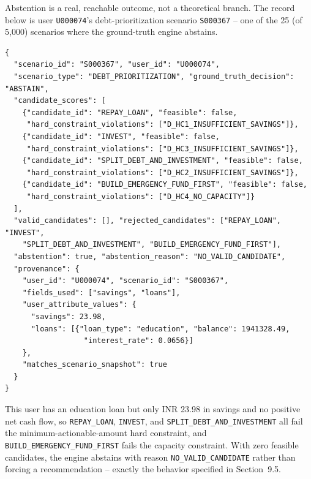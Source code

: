 \documentclass[12pt,a4paper]{article}
\begin{document}
Abstention is a real, reachable outcome, not a theoretical branch. The record below is user \texttt{U000074}'s debt-prioritization scenario \texttt{S000367} -- one of the 25 (of 5{,}000) scenarios where the ground-truth engine abstains.

{\scriptsize
\begin{verbatim}
{
  "scenario_id": "S000367", "user_id": "U000074",
  "scenario_type": "DEBT_PRIORITIZATION", "ground_truth_decision": "ABSTAIN",
  "candidate_scores": [
    {"candidate_id": "REPAY_LOAN", "feasible": false,
     "hard_constraint_violations": ["D_HC1_INSUFFICIENT_SAVINGS"]},
    {"candidate_id": "INVEST", "feasible": false,
     "hard_constraint_violations": ["D_HC3_INSUFFICIENT_SAVINGS"]},
    {"candidate_id": "SPLIT_DEBT_AND_INVESTMENT", "feasible": false,
     "hard_constraint_violations": ["D_HC2_INSUFFICIENT_SAVINGS"]},
    {"candidate_id": "BUILD_EMERGENCY_FUND_FIRST", "feasible": false,
     "hard_constraint_violations": ["D_HC4_NO_CAPACITY"]}
  ],
  "valid_candidates": [], "rejected_candidates": ["REPAY_LOAN", "INVEST",
    "SPLIT_DEBT_AND_INVESTMENT", "BUILD_EMERGENCY_FUND_FIRST"],
  "abstention": true, "abstention_reason": "NO_VALID_CANDIDATE",
  "provenance": {
    "user_id": "U000074", "scenario_id": "S000367",
    "fields_used": ["savings", "loans"],
    "user_attribute_values": {
      "savings": 23.98,
      "loans": [{"loan_type": "education", "balance": 1941328.49,
                  "interest_rate": 0.0656}]
    },
    "matches_scenario_snapshot": true
  }
}
\end{verbatim}
}

This user has an education loan but only INR 23.98 in savings and no positive net cash flow, so \texttt{REPAY\_LOAN}, \texttt{INVEST}, and \texttt{SPLIT\_DEBT\_AND\_INVESTMENT} all fail the minimum-actionable-amount hard constraint, and \texttt{BUILD\_EMERGENCY\_FUND\_FIRST} fails the capacity constraint. With zero feasible candidates, the engine abstains with reason \texttt{NO\_VALID\_CANDIDATE} rather than forcing a recommendation -- exactly the behavior specified in Section~9.5.
\end{document}
